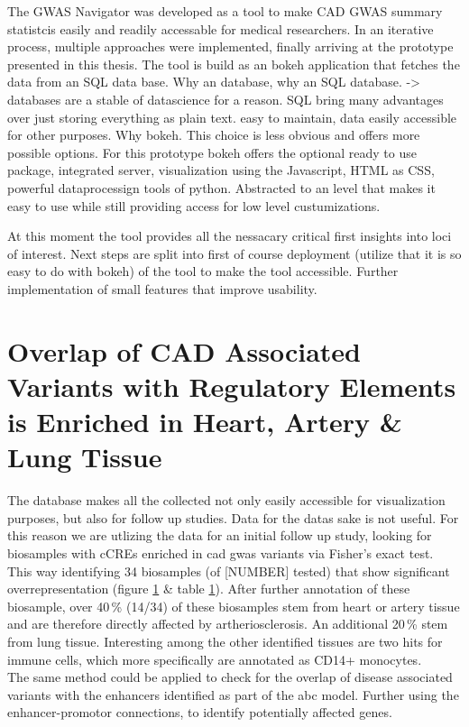 The GWAS Navigator was developed as a tool to make CAD GWAS summary statistcis easily and readily accessable for medical researchers. In an iterative process, multiple approaches were implemented, finally arriving at the prototype presented in this thesis.
The tool is build as an bokeh application that fetches the data from an SQL data base.
Why an database, why an SQL database. -> databases are a stable of datascience for a reason. SQL bring many advantages over just storing everything as plain text. easy to maintain, data easily accessible for other purposes.
Why bokeh. This choice is less obvious and offers more possible options. For this prototype bokeh offers the optional ready to use package, integrated server, visualization using the Javascript, HTML as CSS, powerful dataprocessign tools of python. Abstracted to an level that makes it easy to use while still providing access for low level custumizations.

At this moment the tool provides all the nessacary critical first insights into loci of interest.
Next steps are split into first of course deployment (utilize that it is so easy to do with bokeh) of the tool to make the tool accessible. Further implementation of small features that improve usability.

\section{Overlap of CAD Associated Variants with Regulatory Elements is Enriched in Heart, Artery \& Lung Tissue}
The database makes all the collected not only easily accessible for visualization purposes, but also for follow up studies.
Data for the datas sake is not useful. For this reason we are utlizing the data for an initial follow up study, looking for biosamples with \acp{cCRE} enriched in \ac{cad} \ac{gwas} variants via Fisher's exact test. This way identifying 34 biosamples (of [NUMBER] tested) that show significant overrepresentation (figure \ref{} \& table \ref{}). After further annotation of these biosample, over 40\,\% (14/34) of these biosamples stem from heart or artery tissue and are therefore directly affected by artheriosclerosis. An additional 20\,\% stem from lung tissue. Interesting among the other identified tissues are two hits for immune cells, which more specifically are annotated as CD14+ monocytes. \\
The same method could be applied to check for the overlap of disease associated variants with the enhancers identified as part of the \ac{abc} model. Further using the enhancer-promotor connections, to identify potentially affected genes.
